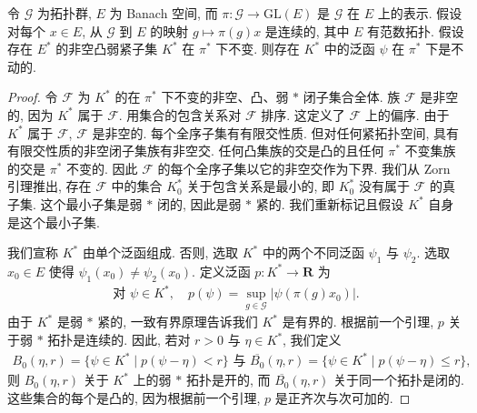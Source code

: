 \documentclass[../../main.tex]{subfiles}
\begin{document}
\begin{theorem}\label{theorem:ch22-kakutani-fixed-point}
令 $\mathcal{G}$ 为拓扑群, $E$ 为 Banach 空间, 而 $\pi:\mathcal{G}\to\mathrm{GL}(E)$ 是 $\mathcal{G}$ 在 $E$ 上的表示. 假设对每个 $x\in E$, 从 $\mathcal{G}$ 到 $E$ 的映射 $g\mapsto\pi(g)x$ 是连续的, 其中 $E$ 有范数拓扑. 假设存在 $E^{*}$ 的非空凸弱紧子集 $K^{*}$ 在 $\pi^{*}$ 下不变. 则存在 $K^{*}$ 中的泛函 $\psi$ 在 $\pi^{*}$ 下是不动的.
\end{theorem}

\begin{proof}
令 $\mathcal{F}$ 为 $K^{*}$ 的在 $\pi^{*}$ 下不变的非空、凸、弱 $*$ 闭子集合全体. 族 $\mathcal{F}$ 是非空的, 因为 $K^{*}$ 属于 $\mathcal{F}$. 用集合的包含关系对 $\mathcal{F}$ 排序. 这定义了 $\mathcal{F}$ 上的偏序. 由于 $K^{*}$ 属于 $\mathcal{F}$, $\mathcal{F}$ 是非空的. 每个全序子集有有限交性质. 但对任何紧拓扑空间, 具有有限交性质的非空闭子集族有非空交. 任何凸集族的交是凸的且任何 $\pi^{*}$ 不变集族的交是 $\pi^{*}$ 不变的. 因此 $\mathcal{F}$ 的每个全序子集以它的非空交作为下界. 我们从 Zorn 引理推出, 存在 $\mathcal{F}$ 中的集合 $K_{0}^{*}$ 关于包含关系是最小的, 即 $K_{0}^{*}$ 没有属于 $\mathcal{F}$ 的真子集. 这个最小子集是弱 $*$ 闭的, 因此是弱 $*$ 紧的. 我们重新标记且假设 $K^{*}$ 自身是这个最小子集.

我们宣称 $K^{*}$ 由单个泛函组成. 否则, 选取 $K^{*}$ 中的两个不同泛函 $\psi_{1}$ 与 $\psi_{2}$. 选取 $x_{0}\in E$ 使得 $\psi_{1}(x_{0})\neq\psi_{2}(x_{0})$. 定义泛函 $p:K^{*}\to\mathbf{R}$ 为
\begin{align*}
\text{对 }\psi\in K^{*},\quad p(\psi)=\sup_{g\in\mathcal{G}}|\psi(\pi(g)x_{0})|.
\end{align*}
由于 $K^{*}$ 是弱 $*$ 紧的, 一致有界原理告诉我们 $K^{*}$ 是有界的. 根据前一个引理, $p$ 关于弱 $*$ 拓扑是连续的. 因此, 若对 $r>0$ 与 $\eta\in K^{*}$, 我们定义
\begin{align}
B_{0}(\eta,r)=\{\psi\in K^{*}\mid p(\psi-\eta)<r\}\text{ 与 }\overline{B_{0}}(\eta,r)=\{\psi\in K^{*}\mid p(\psi-\eta)\leqslant r\},
\label{align:ch22-balls}
\end{align}
则 $B_{0}(\eta,r)$ 关于 $K^{*}$ 上的弱 $*$ 拓扑是开的, 而 $\overline{B_{0}}(\eta,r)$ 关于同一个拓扑是闭的. 这些集合的每个是凸的, 因为根据前一个引理, $p$ 是正齐次与次可加的.


\end{proof}
\end{document}
